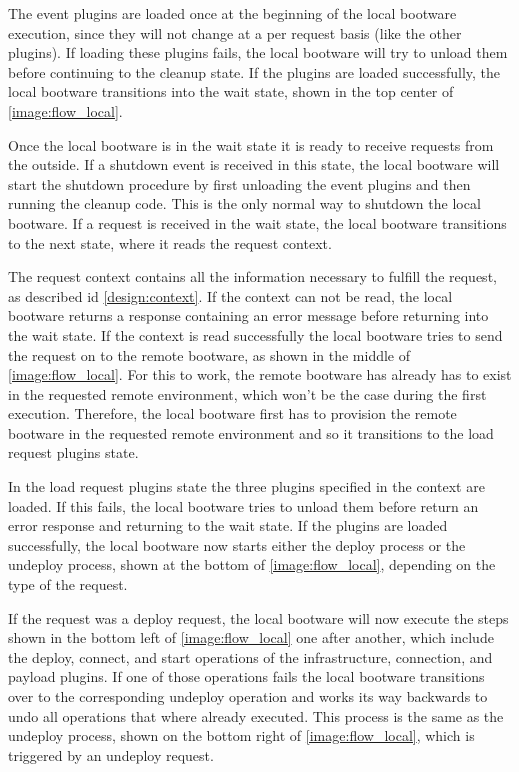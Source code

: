 The event plugins are loaded once at the beginning of the local bootware execution, since they will not change at a per request basis (like the other plugins).
If loading these plugins fails, the local bootware will try to unload them before continuing to the cleanup state.
If the plugins are loaded successfully, the local bootware transitions into the wait state, shown in the top center of \autoref{image:flow_local}.

Once the local bootware is in the wait state it is ready to receive requests from the outside.
If a shutdown event is received in this state, the local bootware will start the shutdown procedure by first unloading the event plugins and then running the cleanup code.
This is the only normal way to shutdown the local bootware.
If a request is received in the wait state, the local bootware transitions to the next state, where it reads the request context.

The request context contains all the information necessary to fulfill the request, as described id \autoref{design:context}.
If the context can not be read, the local bootware returns a response containing an error message before returning into the wait state.
If the context is read successfully the local bootware tries to send the request on to the remote bootware, as shown in the middle of \autoref{image:flow_local}.
For this to work, the remote bootware has already has to exist in the requested remote environment, which won't be the case during the first execution.
Therefore, the local bootware first has to provision the remote bootware in the requested remote environment and so it transitions to the load request plugins state.

In the load request plugins state the three plugins specified in the context are loaded.
If this fails, the local bootware tries to unload them before return an error response and returning to the wait state.
If the plugins are loaded successfully, the local bootware now starts either the deploy process or the undeploy process, shown at the bottom of \autoref{image:flow_local}, depending on the type of the request.

If the request was a deploy request, the local bootware will now execute the steps shown in the bottom left of \autoref{image:flow_local} one after another, which include the deploy, connect, and start operations of the infrastructure, connection, and payload plugins.
If one of those operations fails the local bootware transitions over to the corresponding undeploy operation and works its way backwards to undo all operations that where already executed.
This process is the same as the undeploy process, shown on the bottom right of \autoref{image:flow_local}, which is triggered by an undeploy request.

